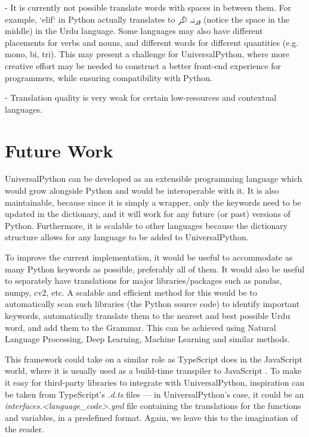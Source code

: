 \documentclass[conference]{IEEEtran}
\begin{document}
- It is currently not possible translate words with spaces in between them. For example, `elif` in Python actually translates to \texturdu{ورنہ اگر} (notice the space in the middle) in the Urdu language. Some languages may also have different placements for verbs and nouns, and different words for different quantities (e.g. mono, bi, tri). This may present a challenge for UniversalPython, where more creative effort may be needed to construct a better front-end experience for programmers, while ensuring compatibility with Python.

- Translation quality is very weak for certain low-resources and contextual languages.


\section{Future Work}

UniversalPython can be developed as an extensible programming language which would grow alongside Python and would be interoperable with it. It is also maintainable, because since it is simply a wrapper, only the keywords need to be updated in the dictionary, and it will work for any future (or past) versions of Python. Furthermore, it is scalable to other languages because the dictionary structure allows for any language to be added to UniversalPython.

To improve the current implementation, it would be useful to accommodate as many Python keywords as possible, preferably all of them. It would also be useful to separately have translations for major libraries/packages such as pandas, numpy, cv2, etc. A scalable and efficient method for this would be to automatically scan such libraries (the Python source code) to identify important keywords, automatically translate them to the nearest and best possible Urdu word, and add them to the Grammar. This can be achieved using Natural Language Processing, Deep Learning, Machine Learning and similar methods.

This framework could take on a similar role as TypeScript does in the JavaScript world, where it is usually used as a build-time transpiler to JavaScript \cite{Understanding_TypeScript}. To make it easy for third-party libraries to integrate with UniversalPython, inspiration can be taken from TypeScript's {\em *.d.ts} files --- in UniversalPython's case, it could be an {\em interfaces.<language\_code>.yml} file containing the translations for the functions and variables, in a predefined format. Again, we leave this to the imagination of the reader.
\end{document}
